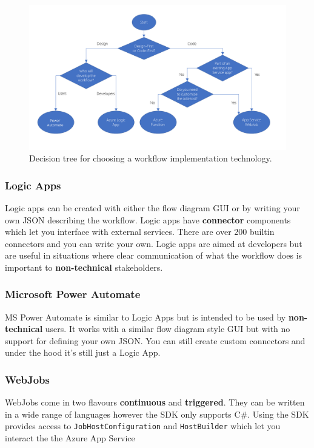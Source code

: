 \documentclass{article}
\newcommand{\code}{\texttt}
\begin{document}
\begin{figure}[h!]
\centering
\includegraphics[scale=0.35]{service-choice-flow-diagram}
\caption{Decision tree for choosing a workflow implementation technology.}
\label{fig:service-choice-flow-diagram}
\end{figure}

\subsubsection{Logic Apps}
Logic apps can be created with either the flow diagram GUI or by writing your own JSON describing the workflow. Logic apps have \textbf{connector} components which let you interface with external services. There are over 200 builtin connectors and you can write your own. Logic apps are aimed at developers but are useful in situations where clear communication of what the workflow does is important to \textbf{non-technical} stakeholders. 

\subsubsection{Microsoft Power Automate}
MS Power Automate is similar to Logic Apps but is intended to be used by \textbf{non-technical} users. It works with a similar flow diagram style GUI but with no support for defining your own JSON. You can still create custom connectors and under the hood it's still just a Logic App.

\subsubsection{WebJobs}
WebJobs come in two flavours \textbf{continuous} and \textbf{triggered}. They can be written in a wide range of languages however the SDK only supports C\#. Using the SDK provides access to \code{JobHostConfiguration} and \code{HostBuilder} which let you interact the the Azure App Service 
\end{document}

